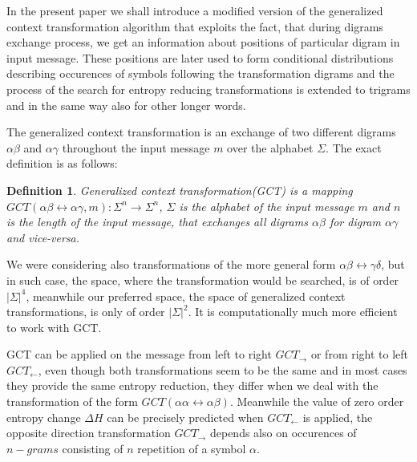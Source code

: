 \documentclass[smallabstract,smallcaptions]{dccpaper}
\newtheorem{defn}{Definition}
\begin{document}
In the present paper we shall introduce a modified version of the generalized context transformation algorithm that exploits the fact, that during digrams exchange process, we get an information about positions of particular digram in input message. These positions are later used to form conditional distributions describing occurences of symbols following the transformation digrams and the process of the search for entropy reducing transformations is extended to trigrams and in the same way also for other longer words.



The generalized context transformation is an exchange of two different digrams $\alpha\beta$ and $\alpha\gamma$ throughout the input message $m$ over the alphabet $\Sigma$. The exact definition is as follows:

\begin{defn}
\label{def:gct}
Generalized context transformation(GCT) is a mapping $GCT(\alpha\beta\leftrightarrow\alpha\gamma,m):\Sigma^{n}\rightarrow\Sigma^{n}$,
$\Sigma$ is the alphabet of the input message $m$ and $n$ is the length of the input message, that exchanges all digrams $\alpha\beta$ for digram $\alpha\gamma$ and vice-versa.
\end{defn}

We were considering also transformations of the more general form $\alpha\beta\leftrightarrow\gamma\delta$, but in such case, the space, where the transformation would be searched, is of order $|\Sigma|^4$, meanwhile our preferred space, the space of generalized context transformations, is only of order $|\Sigma|^2$. It is computationally much more efficient to work with GCT. 

GCT can be applied on the message from left to right $GCT_{\rightarrow}$ or from right to left $GCT_{\leftarrow}$, even though both transformations seem to be the same and in most cases they provide the same entropy reduction, they differ when we deal with the transformation of the form $GCT(\alpha\alpha\leftrightarrow\alpha\beta)$. Meanwhile the value of zero order entropy change $\Delta H$ can be precisely predicted when $GCT_{\leftarrow}$ is applied, the opposite direction transformation $GCT_{\rightarrow}$ depends also on occurences of $n-grams$ consisting of $n$ repetition of a symbol $\alpha$. 
\end{document}
